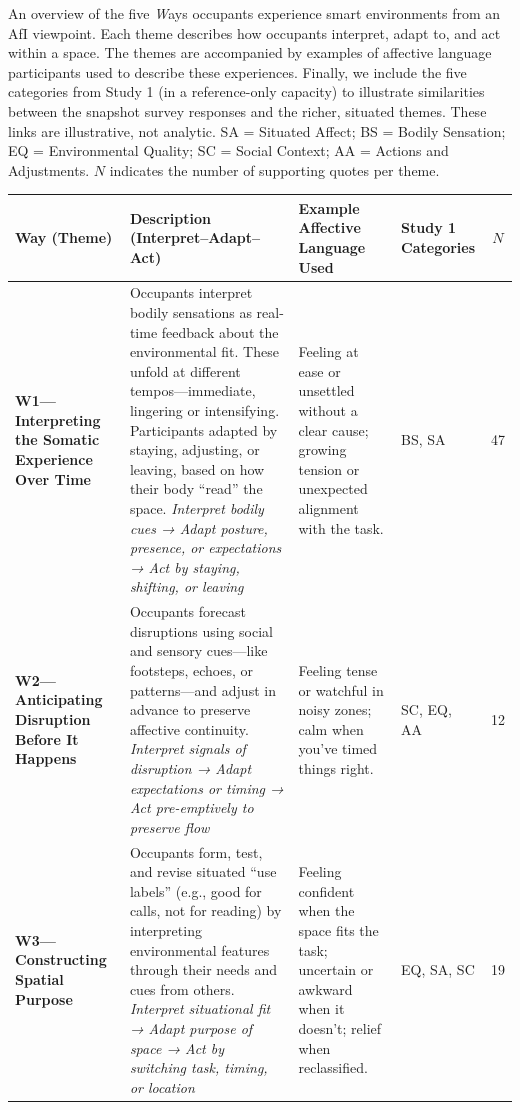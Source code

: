 \begin{maintable}[tbp]
\caption{An overview of the five \emph{W}ays occupants experience smart environments from an AfI viewpoint. Each theme describes how occupants interpret, adapt to, and act within a space. The themes are accompanied by examples of affective language participants used to describe these experiences. Finally, we include the five categories from Study 1 (in a reference-only capacity) to illustrate similarities between the snapshot survey responses and the richer, situated themes. These links are illustrative, not analytic. \smallskip
{\fontsize{7}{8.2}\selectfont SA = Situated Affect; BS = Bodily Sensation; EQ = Environmental Quality; SC = Social Context; AA = Actions and Adjustments. $N$ indicates the number of supporting quotes per theme.}}
\fontsize{7.8}{9.2}\selectfont
\setlength{\tabcolsep}{2.4pt}
\renewcommand{\arraystretch}{1.04}

\begin{tabularx}{\linewidth}{@{}p{.20\linewidth} Y p{.20\linewidth} p{.10\linewidth} c@{}}
\toprule
\textbf{Way (Theme)} & \textbf{Description (Interpret–Adapt–Act)} & \textbf{Example Affective Language Used} & \textbf{Study 1 Categories} & \textbf{$N$} \\
\midrule

\textbf{W1---Interpreting the Somatic Experience Over Time} & 
Occupants interpret bodily sensations as real-time feedback about the environmental fit. These unfold at different tempos---immediate, lingering or intensifying. Participants adapted by staying, adjusting, or leaving, based on how their body “read” the space. \newline 
\textit{Interpret bodily cues → Adapt posture, presence, or expectations → Act by staying, shifting, or leaving} & 
Feeling at ease or unsettled without a clear cause; growing tension or unexpected alignment with the task. & BS, SA & 47 \\

\textbf{W2---Anticipating Disruption Before It Happens} & 
Occupants forecast disruptions using social and sensory cues—like footsteps, echoes, or patterns—and adjust in advance to preserve affective continuity. \newline 
\textit{Interpret signals of disruption → Adapt expectations or timing → Act pre-emptively to preserve flow} &
Feeling tense or watchful in noisy zones; calm when you’ve timed things right. & SC, EQ, AA & 12 \\

\textbf{W3---Constructing Spatial Purpose} & 
Occupants form, test, and revise situated “use labels” (e.g., good for calls, not for reading) by interpreting environmental features through their needs and cues from others. \newline 
\textit{Interpret situational fit → Adapt purpose of space → Act by switching task, timing, or location} &
Feeling confident when the space fits the task; uncertain or awkward when it doesn’t; relief when reclassified. & EQ, SA, SC & 19 \\


\end{tabularx}
\end{maintable}
